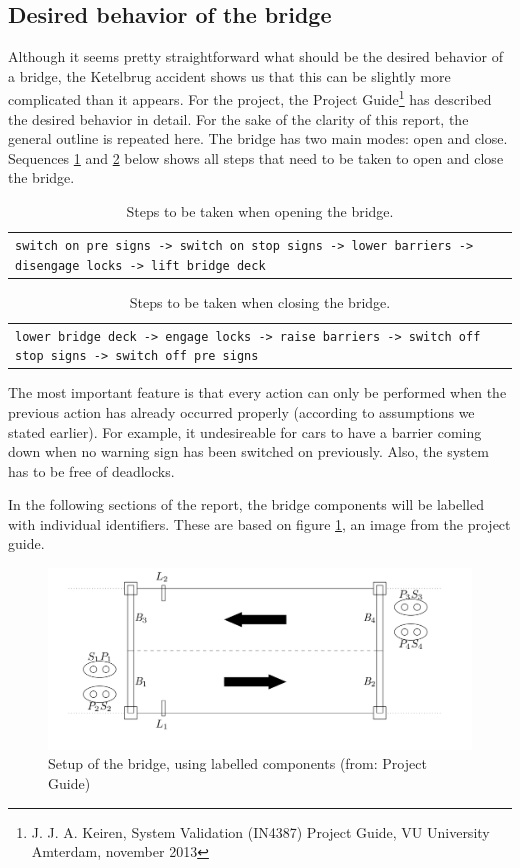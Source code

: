 \subsection{Desired behavior of the bridge}

Although it seems pretty straightforward what should be the desired behavior of a bridge, the Ketelbrug accident shows us that this can be slightly more complicated than it appears. For the project, the Project Guide\footnote{J. J. A. Keiren, System Validation (IN4387) Project Guide, VU University Amterdam, november 2013} has described the desired behavior in detail. For the sake of the clarity of this report, the general outline is repeated here. The bridge has two main modes: open and close. Sequences \ref{tab:open} and \ref{tab:close} below shows all steps that need to be taken to open and close the bridge.
%
\begin{table}[h]%
\begin{tabular}{l}
	\footnotesize
	\texttt{switch on pre signs -> switch on stop signs -> lower barriers -> disengage locks -> lift bridge deck}\\
\end{tabular}
\caption{Steps to be taken when opening the bridge.}
\label{tab:open}
\end{table}
%
\begin{table}[h]%
\begin{tabular}{l}
	\footnotesize
	\texttt{lower bridge deck -> engage locks -> raise barriers -> switch off stop signs -> switch off pre signs}\\
\end{tabular}
\caption{Steps to be taken when closing the bridge.}
\label{tab:close}
\end{table}
%
The most important feature is that every action can only be performed when the previous action has already occurred properly (according to assumptions we stated earlier). For example, it undesireable for cars to have a barrier coming down when no warning sign has been switched on previously. Also, the system has to be free of deadlocks. 

In the following sections of the report, the bridge components will be labelled with individual identifiers. These are based on figure \ref{fig:setup}, an image from the project guide. 
%
\begin{figure}[htb]%
\includegraphics[width=\columnwidth]{Images/Setup.png}%
\caption{Setup of the bridge, using labelled components (from: Project Guide)}%
\label{fig:setup}%
\end{figure}
%

\newpage